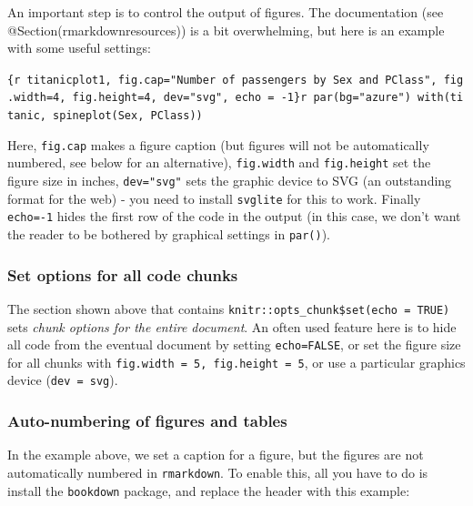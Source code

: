 \documentclass[]{book}
\begin{document}
An important step is to control the output of figures. The documentation (see @Section(rmarkdownresources)) is a bit overwhelming, but here is an example with some useful settings:

\texttt{\{r\ titanicplot1,\ fig.cap="Number\ of\ passengers\ by\ Sex\ and\ PClass",\ fig.width=4,\ fig.height=4,\ dev="svg",\ echo\ =\ -1\}\textasciigrave{}r\textquotesingle{}\textquotesingle{}\textasciigrave{}\ par(bg="azure")\ with(titanic,\ spineplot(Sex,\ PClass))}

Here, \texttt{fig.cap} makes a figure caption (but figures will not be automatically numbered, see below for an alternative), \texttt{fig.width} and \texttt{fig.height} set the figure size in inches, \texttt{dev="svg"} sets the graphic device to SVG (an outstanding format for the web) - you need to install \texttt{svglite} for this to work. Finally \texttt{echo=-1} hides the first row of the code in the output (in this case, we don't want the reader to be bothered by graphical settings in \texttt{par()}).

\hypertarget{set-options-for-all-code-chunks}{%
\subsubsection*{Set options for all code chunks}\label{set-options-for-all-code-chunks}}

The section shown above that contains \texttt{knitr::opts\_chunk\$set(echo\ =\ TRUE)} sets \emph{chunk options for the entire document}. An often used feature here is to hide all code from the eventual document by setting \texttt{echo=FALSE}, or set the figure size for all chunks with \texttt{fig.width\ =\ 5,\ fig.height\ =\ 5}, or use a particular graphics device (\texttt{dev\ =\ \textquotesingle{}svg\textquotesingle{}}).

\hypertarget{auto-numbering-of-figures-and-tables}{%
\subsubsection*{Auto-numbering of figures and tables}\label{auto-numbering-of-figures-and-tables}}

In the example above, we set a caption for a figure, but the figures are not automatically numbered in \texttt{rmarkdown}. To enable this, all you have to do is install the \texttt{bookdown} package, and replace the header with this example:
\end{document}
